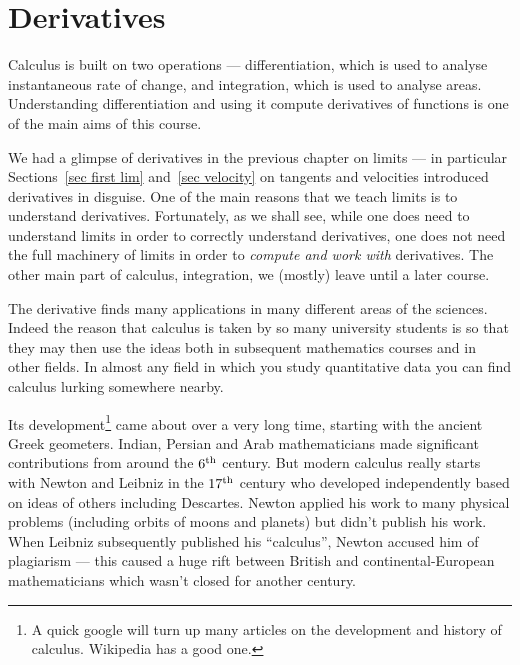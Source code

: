 %
%

\def\lin{{\text{LIN}}}
\def\prod{{\text{PR}}}
\def\quot{{\text{QR}}}
\def\simp{{\text{SMP}}}

\graphicspath{{figures/differentiation/}}
\chapter{Derivatives}\label{chap deriv}

Calculus is built on two operations --- differentiation, which is used to analyse
instantaneous rate of change, and integration, which is used to analyse areas.
Understanding differentiation and using it compute derivatives of functions is one of the
main aims of this course.

We had a glimpse of derivatives in the previous chapter on limits --- in particular
Sections~\ref{sec first lim} and~\ref{sec velocity} on tangents and velocities introduced
derivatives in disguise. One of the main reasons that we teach limits is to understand
derivatives. Fortunately, as we shall see, while one does need to understand limits in
order to correctly understand derivatives, one does not need the full machinery of limits
in order to \emph{compute and work with} derivatives. The other main part of calculus,
integration, we (mostly) leave until a later course.

The derivative finds many applications in many different areas of the sciences. Indeed
the
reason that calculus is taken by so many university students is so that they may then use
the ideas both in subsequent mathematics courses and in other fields. In almost any field
in which you study quantitative data you can find calculus lurking somewhere nearby.

Its development\footnote{A quick google will turn up many articles on the development and
history of calculus. Wikipedia has a good one.} came about over a very long time,
starting
with the ancient Greek geometers. Indian, Persian and Arab mathematicians made
significant
contributions from around the $6^{\rm th}$ century. But modern calculus really starts
with
Newton and Leibniz in the $17^{\rm th}$ century who developed independently based on
ideas
of others including Descartes. Newton applied his work to many physical problems
(including orbits of moons and planets) but didn't publish his work. When Leibniz
subsequently published his ``calculus'', Newton accused him of plagiarism --- this caused
a huge rift between British and  continental-European mathematicians which wasn't closed
for another century.



